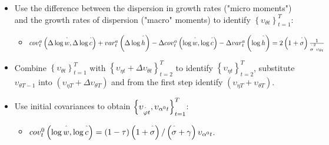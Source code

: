\documentclass[notes=show]{beamer}
\begin{document}
\bigskip

\begin{frame}%



\begin{itemize}
\item Use the difference between the dispersion in growth rates ("micro
moments") and the growth rates of dispersion ("macro" moments) to identify $%
\left\{ \upsilon _{\theta t}\right\} _{t=1}^{T}$:

\begin{itemize}
\item $cov_{t}^{a}\left( \Delta \log \overset{\symbol{94}}{w},\Delta \log 
\overset{\symbol{94}}{c}\right) +var_{t}^{a}\left( \Delta \log \overset{%
\symbol{94}}{h}\right) -\Delta cov_{t}^{a}\left( \log \overset{\symbol{94}}{w%
},\log \overset{\symbol{94}}{c}\right) -\Delta var_{t}^{a}\left( \log 
\overset{\symbol{94}}{h}\right) =2\left( 1+\overset{\symbol{94}}{\sigma }%
\right) \frac{1}{\overset{\symbol{94}}{\sigma }^{2}\upsilon _{\theta t}}$
\end{itemize}

\item Combine $\left\{ \upsilon _{\theta t}\right\} _{t=1}^{T}$ with $%
\left\{ \upsilon _{\eta t}+\Delta \upsilon _{\theta t}\right\} _{t=2}^{T}$
to identify $\left\{ \upsilon _{\eta t}\right\} _{t=2}^{T}$, substitute $%
\upsilon _{\theta T-1}$ into $\left( \upsilon _{\eta T}+\Delta \upsilon
_{\theta T}\right) $ and from the first step identify $\left( \upsilon
_{\eta T}+\upsilon _{\theta T}\right) $.

\item Use initial covariances to obtain $\left\{ \upsilon _{\overset{\symbol{%
94}}{\varphi }t},\upsilon _{\alpha ^{0}t}\right\} _{t=1}^{T}$:

\begin{itemize}
\item $cov_{t}^{0}\left( \log \overset{\symbol{94}}{w},\log \overset{\symbol{%
94}}{c}\right) =\left( 1-\tau \right) \left( 1+\overset{\symbol{94}}{\sigma }%
\right) /\left( \overset{\symbol{94}}{\sigma }+\gamma \right) \upsilon
_{\alpha ^{0}t}$.
\end{itemize}
\end{itemize}

\transboxout%
\end{frame}%
\end{document}
